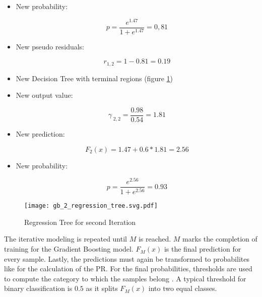 \begin{itemize}

    \item New probability:

    \begin{equation*}
        p = \frac{e^{1.47}}{1 + e^{1.47}} = 0,81
    \end{equation*}

    \item New pseudo residuals: 

    \begin{equation*}
        r_{1, 2} = 1 - 0.81 = 0.19
    \end{equation*}
    
    \item New Decision Tree with terminal regions (figure \ref{fig:gb_2_regression_tree})

    \item New output value: 

    \begin{equation*}
        \gamma_{\;2,2} = \frac{0.98}{0.54} = 1.81 
    \end{equation*}

    \item New prediction:

    \begin{equation*}
        F_{2}(x) = 1.47 + 0.6 * 1.81 = 2.56
    \end{equation*}

    \item New probability:

    \begin{equation*}
        p = \frac{e^{2.56}}{1 + e^{2.56}} = 0.93 
    \end{equation*}

\end{itemize}

\begin{figure}[H]
    \centering
    \caption[]{Regression Tree for second Iteration}
    \label{fig:gb_2_regression_tree}
    \texttt{[image: gb\_2\_regression\_tree.svg.pdf]}
\end{figure}

The iterative modeling is repeated until \(M\) is reached. \(M\) marks the completion of training for the Gradient 
Boosting model. \(F_{M}(x)\) is the final prediction for every sample. Lastly, the predictions
must again be transformed to probabilites like for the calculation of the \ac{PR}. For the final probabilities, 
thresholds are used to compute the category to which the samples belong \cite[p. 1204]{Friedman_2001}. A typical threshold 
for binary classification is \(0.5\) as it splits \(F_{M}(x)\) into two equal classes.

